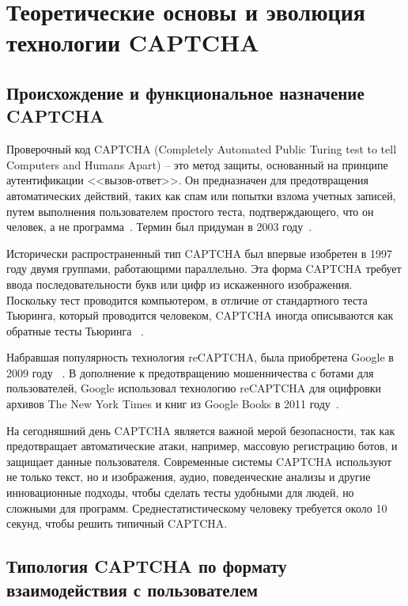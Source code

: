 \chapter{Теоретические основы и эволюция технологии CAPTCHA}

\section{Происхождение и функциональное назначение CAPTCHA}

Проверочный код CAPTCHA (Completely Automated Public Turing test to tell Computers 
and Humans Apart) -- это метод защиты, основанный на принципе аутентификации 
<<вызов-ответ>>. Он предназначен для предотвращения автоматических действий, таких 
как спам или попытки взлома учетных записей, путем выполнения пользователем 
простого теста, подтверждающего, что он человек, а не программа~\cite{support}. 
Термин был придуман в 2003 году~\cite{captcha2003}.

Исторически распространенный тип CAPTCHA был впервые изобретен в 1997 году двумя 
группами, работающими параллельно. Эта форма CAPTCHA требует ввода 
последовательности букв или цифр из искаженного изображения. Поскольку тест 
проводится компьютером, в отличие от стандартного теста Тьюринга, который 
проводится человеком, CAPTCHA иногда описываются как обратные тесты Тьюринга
~\cite{reversecaptcha}.

Набравшая популярность технология reCAPTCHA, была приобретена Google в 2009 году
~\cite{googlerecaptcha}. В дополнение к предотвращению мошенничества с ботами для 
пользователей, Google использовал технологию reCAPTCHA для оцифровки архивов The 
New York Times и книг из Google Books в 2011 году~\cite{nytimes}.

На сегодняшний день CAPTCHA является важной мерой безопасности, так как 
предотвращает автоматические атаки, например, массовую регистрацию ботов, и 
защищает данные пользователя. Современные системы CAPTCHA используют не только 
текст, но и изображения, аудио, поведенческие анализы и другие инновационные 
подходы, чтобы сделать тесты удобными для людей, но сложными для программ. 
Среднестатистическому человеку требуется около 10 секунд, чтобы решить типичный 
CAPTCHA.

\section{Типология CAPTCHA по формату взаимодействия с пользователем}

